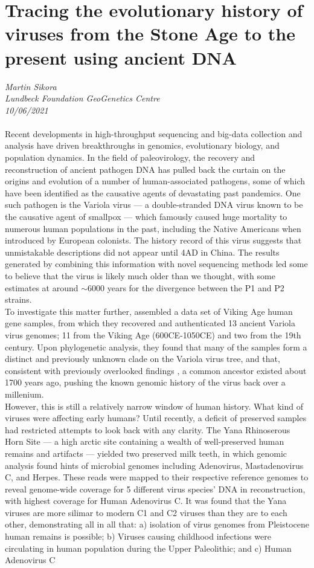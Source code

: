 \documentclass[11pt]{article}
\begin{document}
\section{Tracing the evolutionary history of viruses from the Stone Age to the present using ancient DNA}
\textit{Martin Sikora\\Lundbeck Foundation GeoGenetics Centre\\10/06/2021}
\\
\\Recent developments in high-throughput sequencing and big-data collection and analysis have driven breakthroughs in genomics, evolutionary biology, and population dynamics. In the field of paleovirology, the recovery and reconstruction of ancient pathogen DNA has pulled back the curtain on the origins and evolution of a number of human-associated pathogens, some of which have been identified as the causative agents of devastating past pandemics. One such pathogen is the Variola virus — a double-stranded DNA virus known to be the causative agent of smallpox — which famously caused huge mortality to numerous human populations in the past, including the Native Americans when introduced by European colonists. The history record of this virus suggests that unmistakable descriptions did not appear until 4AD in China. The results generated by combining this information with novel sequencing methods led some to believe that the virus is likely much older than we thought, with some estimates at around $\sim6000$ years for the divergence between the P1 and P2 strains. \\To investigate this matter further, \cite{muhlemann2020diverse} assembled a data set of Viking Age human gene samples, from which they recovered and authenticated 13 ancient Variola virus genomes; 11 from the Viking Age (600CE-1050CE) and two from the 19th century. Upon phylogenetic analysis, they found that many of the samples form a distinct and previously unknown clade on the Variola virus tree, and that, consistent with previously overlooked findings \citep{duggan201617th}, a common ancestor existed about 1700 years ago, pushing the known genomic history of the virus back over a millenium.\\However, this is still a relatively narrow window of human history. What kind of viruses were affecting early humans? Until recently, a deficit of preserved samples had restricted attempts to look back with any clarity. The Yana Rhinoserous Horn Site — a high arctic site containing a wealth of well-preserved human remains and artifacts — yielded two preserved milk teeth, in which genomic analysis found hints of microbial genomes including Adenovirus, Mastadenovirus C, and Herpes. These reads were mapped to their respective reference genomes to reveal genome-wide coverage for 5 different virus species’ DNA in reconstruction, with highest coverage for Human Adenovirus C. It was found that the Yana viruses are more silimar to modern C1 and C2 viruses than they are to each other, demonstrating all in all that: a) isolation of virus genomes from Pleistocene human remains is possible; b) Viruses causing childhood infections were circulating in human population during the Upper Paleolithic; and c) Human Adenovirus C 
\end{document}
